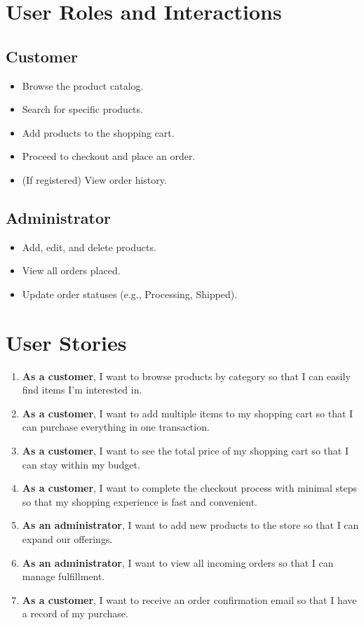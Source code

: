 \documentclass[a4paper,12pt]{article}
\begin{document}
	\section{User Roles and Interactions}
	\subsection{Customer}
	\begin{itemize}
		\item Browse the product catalog.
		\item Search for specific products.
		\item Add products to the shopping cart.
		\item Proceed to checkout and place an order.
		\item (If registered) View order history.
	\end{itemize}
	
	\subsection{Administrator}
	\begin{itemize}
		\item Add, edit, and delete products.
		\item View all orders placed.
		\item Update order statuses (e.g., Processing, Shipped).
	\end{itemize}
	
	\section{User Stories}
	\begin{enumerate}
		\item \textbf{As a customer}, I want to browse products by category so that I can easily find items I'm interested in.
		\item \textbf{As a customer}, I want to add multiple items to my shopping cart so that I can purchase everything in one transaction.
		\item \textbf{As a customer}, I want to see the total price of my shopping cart so that I can stay within my budget.
		\item \textbf{As a customer}, I want to complete the checkout process with minimal steps so that my shopping experience is fast and convenient.
		\item \textbf{As an administrator}, I want to add new products to the store so that I can expand our offerings.
		\item \textbf{As an administrator}, I want to view all incoming orders so that I can manage fulfillment.
		\item \textbf{As a customer}, I want to receive an order confirmation email so that I have a record of my purchase.
	\end{enumerate}
	
\end{document}
